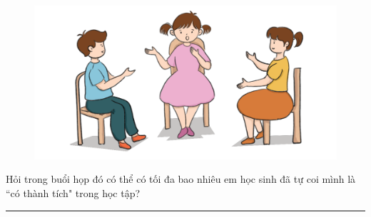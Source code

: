 \begin{multicols}{2}
	\begin{figure}[H]
		\centering
		\vspace*{-10pt}
		\captionsetup{labelformat= empty, justification=centering}
		\includegraphics[width=0.85\linewidth]{Hinh6}
		\vspace*{-10pt}
	\end{figure}
	Hỏi trong buổi họp đó có thể có tối đa bao nhiêu em học sinh đã tự coi mình là ``có thành tích" trong học tập?
\end{multicols}
\vspace*{-10pt}
{\color{toancuabi}\rule{1\linewidth}{0.1pt}}
\begingroup
{} 
\centering
\endgroup
\vspace*{75pt}

